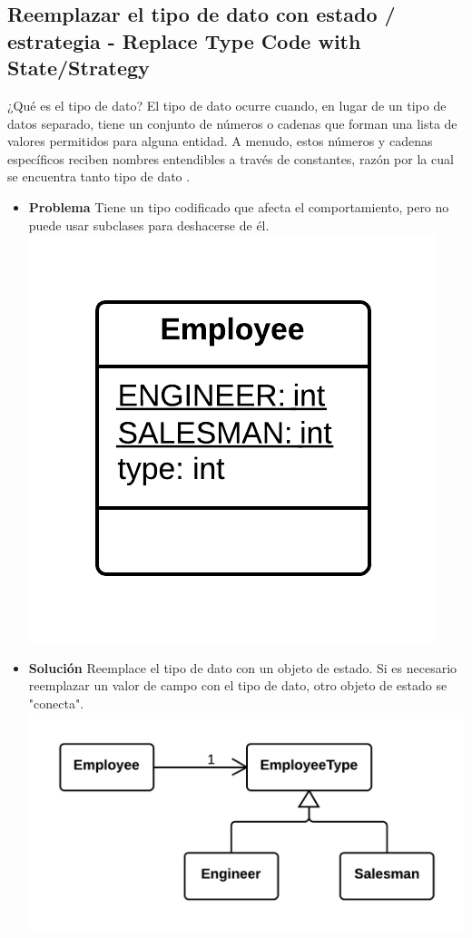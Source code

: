 \documentclass[11pt,a4paper,oneside]{book}
\begin{document}
\subsection{Reemplazar el tipo de dato con estado / estrategia -  Replace Type Code with State/Strategy}
¿Qué es el tipo de dato? El tipo de dato ocurre cuando, en lugar de un tipo de datos separado, tiene un conjunto de números o cadenas que forman una lista de valores permitidos para alguna entidad. A menudo, estos números y cadenas específicos reciben nombres entendibles a través de constantes, razón por la cual se encuentra tanto tipo de dato .
\label{replacetypecodewithstatestrategy}
\begin{itemize}
    \item \textbf{Problema} Tiene un tipo codificado que afecta el comportamiento, pero no puede usar subclases para deshacerse de él.\\
    \centering \includegraphics[scale=0.2]{replacetypecodewithstatestrategyproblem}
    \item \textbf{Solución} Reemplace el tipo de dato con un objeto de estado. Si es necesario reemplazar un valor de campo con el tipo de dato, otro objeto de estado se "conecta".\\
    \centering \includegraphics[scale=0.2]{replacetypecodewithstatestrategysolution}
\end{itemize}
    
\end{document}
